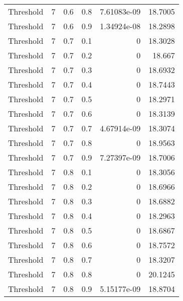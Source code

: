 \documentclass{article}
\begin{document}
\begin{longtable}[H]{lrrrrr}
 Threshold      &       7 &   0.6 &            0.8 &      7.61083e-09 &         18.7005 \\
 Threshold      &       7 &   0.6 &            0.9 &      1.34924e-08 &         18.2898 \\
 Threshold      &       7 &   0.7 &            0.1 &      0           &         18.3028 \\
 Threshold      &       7 &   0.7 &            0.2 &      0           &         18.667  \\
 Threshold      &       7 &   0.7 &            0.3 &      0           &         18.6932 \\
 Threshold      &       7 &   0.7 &            0.4 &      0           &         18.7443 \\
 Threshold      &       7 &   0.7 &            0.5 &      0           &         18.2971 \\
 Threshold      &       7 &   0.7 &            0.6 &      0           &         18.3139 \\
 Threshold      &       7 &   0.7 &            0.7 &      4.67914e-09 &         18.3074 \\
 Threshold      &       7 &   0.7 &            0.8 &      0           &         18.9563 \\
 Threshold      &       7 &   0.7 &            0.9 &      7.27397e-09 &         18.7006 \\
 Threshold      &       7 &   0.8 &            0.1 &      0           &         18.3056 \\
 Threshold      &       7 &   0.8 &            0.2 &      0           &         18.6966 \\
 Threshold      &       7 &   0.8 &            0.3 &      0           &         18.6882 \\
 Threshold      &       7 &   0.8 &            0.4 &      0           &         18.2963 \\
 Threshold      &       7 &   0.8 &            0.5 &      0           &         18.6867 \\
 Threshold      &       7 &   0.8 &            0.6 &      0           &         18.7572 \\
 Threshold      &       7 &   0.8 &            0.7 &      0           &         18.3207 \\
 Threshold      &       7 &   0.8 &            0.8 &      0           &         20.1245 \\
 Threshold      &       7 &   0.8 &            0.9 &      5.15177e-09 &         18.8704 \\

\end{longtable}
\end{document}
